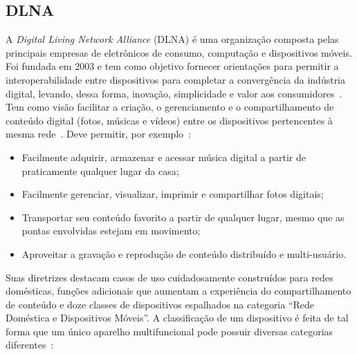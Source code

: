 \subsection{DLNA}

A \emph{Digital Living Network Alliance} (DLNA) é uma organização composta pelas principais empresas de eletrônicos de consumo, computação e dispositivos móveis. Foi fundada em 2003 e tem como objetivo fornecer orientações para permitir a interoperabilidade entre dispositivos para completar a convergência da indústria digital, levando, dessa forma, inovação, simplicidade e valor aos consumidores~\cite{dlnaoverview}. Tem como visão facilitar a criação, o gerenciamento e o compartilhamento de conteúdo digital (fotos, músicas e vídeos) entre os dispositivos pertencentes à mesma rede~\cite{dlnahdvideostreaming}. Deve permitir, por exemplo~\cite{dlnaoverview}:

\begin{itemize}
	\item Facilmente adquirir, armazenar e acessar música digital a partir de praticamente qualquer lugar da casa;
	\item Facilmente gerenciar, visualizar, imprimir e compartilhar fotos digitais;
	\item Transportar seu conteúdo favorito a partir de qualquer lugar, mesmo que as pontas envolvidas estejam em movimento;
	\item Aproveitar a gravação e reprodução de conteúdo distribuído e multi-usuário.
\end{itemize}

Suas diretrizes destacam casos de uso cuidadosamente construídos para redes domésticas, funções adicionais que aumentam a experiência do compartilhamento de conteúdo e doze classes de dispositivos espalhados na categoria ``Rede Doméstica e Dispositivos Móveis''. A classificação de um dispositivo é feita de tal forma que um único aparelho multifuncional pode possuir diversas categorias diferentes~\cite{dlnahdvideostreaming, dlnaclasses}:

